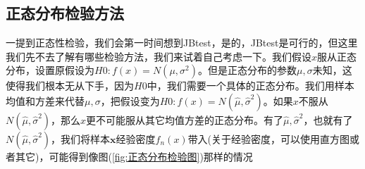     \subsection{正态分布检验方法}
        \par
        一提到正态性检验，我们会第一时间想到JBtest，是的，JBtest是可行的，但这里我们先不去了解有哪些检验方法，我们来试着自己考虑一下。我们假设$x$服从正态分布，设置原假设为$H0:f(x)=N(\mu,\sigma^2)$。但是正态分布的参数$\mu,\sigma$未知，这使得我们根本无从下手，因为$H0$中，我们需要一个具体的正态分布。我们用样本均值和方差来代替$\mu,\sigma$，把假设变为$H0:f(x)=N(\hat{\mu},\hat{\sigma}^2)$。如果$x$不服从$N(\hat{\mu},\hat{\sigma}^2)$，那么$x$更不可能服从其它均值方差的正态分布。有了$\hat{\mu},\hat{\sigma}^2$，也就有了$N(\hat{\mu},\hat{\sigma}^2)$，我们将样本$\mathbf{x}$经验密度$f_n(x)$带入(关于经验密度，可以使用直方图或者其它)，可能得到像图(\ref{fig:正态分布检验图})那样的情况
